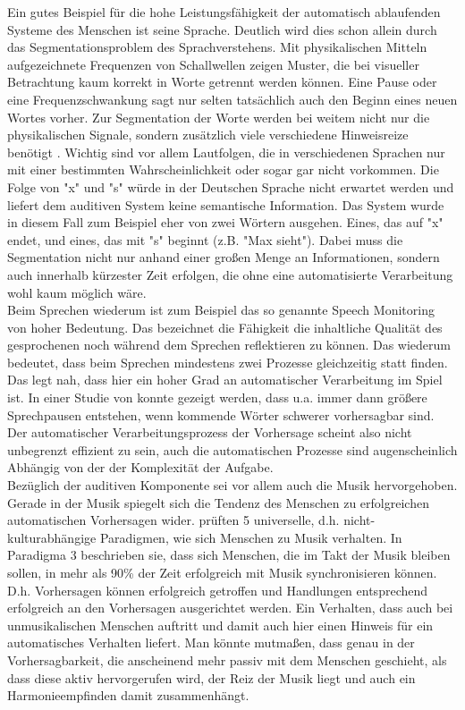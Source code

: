 \documentclass[doc,a4paper,12pt]{apa6}
\begin{document}
Ein gutes Beispiel für die hohe Leistungsfähigkeit der automatisch ablaufenden Systeme des Menschen ist seine Sprache. Deutlich wird dies schon allein durch das Segmentationsproblem des Sprachverstehens. Mit physikalischen Mitteln aufgezeichnete Frequenzen von Schallwellen zeigen Muster, die bei visueller Betrachtung kaum korrekt in Worte getrennt werden können. Eine Pause oder eine Frequenzschwankung sagt nur selten tatsächlich auch den Beginn eines neuen Wortes vorher. Zur Segmentation der Worte werden bei weitem nicht nur die physikalischen Signale, sondern zusätzlich viele verschiedene Hinweisreize benötigt \parencites[u.a.][]{brent1996distributional}{saffran1996word}. Wichtig sind vor allem Lautfolgen, die in verschiedenen Sprachen nur mit einer bestimmten Wahrscheinlichkeit oder sogar gar nicht vorkommen. Die Folge von "x" und "s" würde in der Deutschen Sprache nicht erwartet werden und liefert dem auditiven System keine semantische Information. Das System wurde in diesem Fall zum Beispiel eher von zwei Wörtern ausgehen. Eines, das auf "x" endet, und eines, das mit "s" beginnt (z.B. "Max sieht"). Dabei muss die Segmentation nicht nur anhand einer großen Menge an Informationen, sondern auch innerhalb kürzester Zeit erfolgen, die ohne eine automatisierte Verarbeitung wohl kaum möglich wäre.\\
Beim Sprechen wiederum ist zum Beispiel das so genannte Speech Monitoring \parencites{levelt1983monitoring}{postma2000detection} von hoher Bedeutung. Das bezeichnet die Fähigkeit die inhaltliche Qualität des gesprochenen noch während dem Sprechen reflektieren zu können. Das wiederum bedeutet, dass beim Sprechen mindestens zwei Prozesse gleichzeitig statt finden. Das legt nah, dass hier ein hoher Grad an automatischer Verarbeitung im Spiel ist. In einer Studie von \textcite{goldman1958speech} konnte gezeigt werden, dass u.a. immer dann größere Sprechpausen entstehen, wenn kommende Wörter schwerer vorhersagbar sind. Der automatischer Verarbeitungsprozess der Vorhersage scheint also nicht unbegrenzt effizient zu sein, auch die automatischen Prozesse sind augenscheinlich Abhängig von der der Komplexität der Aufgabe.\\
Bezüglich der auditiven Komponente sei vor allem auch die Musik hervorgehoben. Gerade in der Musik spiegelt sich die Tendenz des Menschen zu erfolgreichen automatischen Vorhersagen wider. \textcite{drake2001quest} prüften 5 universelle, d.h. nicht-kulturabhängige Paradigmen, wie sich Menschen zu Musik verhalten. In Paradigma 3 beschrieben sie, dass sich Menschen, die im Takt der Musik bleiben sollen, in mehr als 90\% der Zeit erfolgreich mit Musik synchronisieren können. D.h. Vorhersagen können erfolgreich getroffen und Handlungen entsprechend erfolgreich an den Vorhersagen ausgerichtet werden. Ein Verhalten, dass auch bei unmusikalischen Menschen auftritt und damit auch hier einen Hinweis für ein automatisches Verhalten liefert. Man könnte mutmaßen, dass genau in der Vorhersagbarkeit, die anscheinend mehr passiv mit dem Menschen geschieht, als dass diese aktiv hervorgerufen wird, der Reiz der Musik liegt und auch ein Harmonieempfinden damit zusammenhängt.
\end{document}
